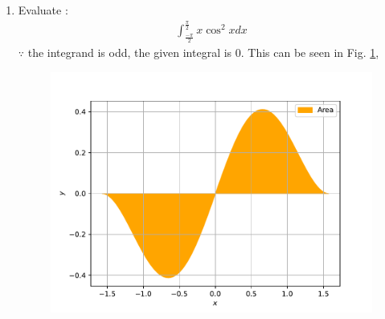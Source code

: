 \documentclass[journal,12pt,twocolumn]{IEEEtran}
\renewcommand\thesection{\arabic{section}}
\begin{document}
\begin{enumerate}[label=\thesection.\arabic*.,ref=\thesection.\theenumi]
\item  Evaluate :
	\begin{align}
         \int_{\frac{-\pi}{2}}^{\frac{\pi}{2}} x \cos^2 x dx \nonumber
	\end{align}  
	\solution $\because$ the integrand is odd, the given integral is 0. 
This can be seen in Fig. 
	\ref{fig:cont-12-13},
\begin{figure}[!ht]
	\centering
	\includegraphics[width=\columnwidth]{figs/cont-12-13.pdf}
	\caption{}
	\label{fig:cont-12-13}
\end{figure}



\end{enumerate}
\end{document}
